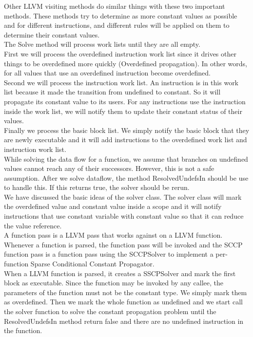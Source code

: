 Other LLVM visiting methods do similar things with these two important methods. These methods try to determine as more constant values as possible and for different instructions, and different rules will be applied on them to determine their constant values. \\
The Solve method will process work lists until they are all empty. \\
First we will process the overdefined instruction work list since it drives other things to be overdefined more quickly (Overdefined propagation). In other words, for all values that use an overdefined instruction become overdefined. \\
Second we will process the instruction work list. An instruction is in this work list because it made the transition from undefined to constant. So it will propagate its constant value to its users. For any instructions use the instruction inside the work list, we will notify them to update their constant status of their values. \\
Finally we process the basic block list. We simply notify the basic block that they are newly executable and it will add instructions to the overdefined work list and instruction work list. \\
While solving the data flow for a function, we assume that branches on undefined values cannot reach any of their successors. However, this is not a safe assumption.  After we solve dataflow, the method ResolvedUndefsIn should be use to handle this.  If this returns true, the solver should be rerun. \\
We have discussed the basic ideas of the solver class. The solver class will mark the overdefined value and constant value inside a scope and it will notify instructions that use constant variable with constant value so that it can reduce the value reference. \\
A function pass is a LLVM pass that works against on a LLVM function. Whenever a function is parsed, the function pass will be invoked and the SCCP function pass is a function pass using the SCCPSolver to implement a per-function Sparse Conditional Constant Propagator. \\
When a LLVM function is parsed, it creates a SSCPSolver and mark the first block as executable. Since the function may be invoked by any callee, the parameters of the function must not be the constant type. We simply mark them as overdefined. Then we mark the whole function as undefined and we start call the solver function to solve the constant propagation problem until the ResolvedUndefsIn method return false and there are no undefined instruction in the function. \\
